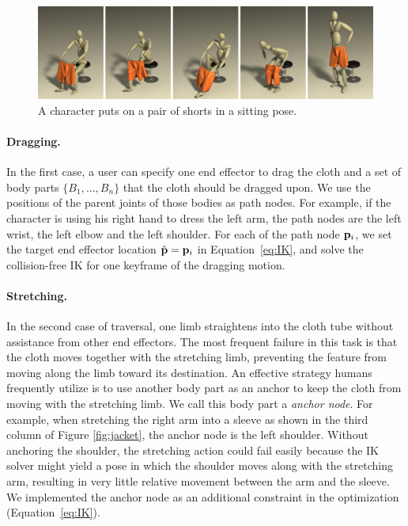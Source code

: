 \begin{figure}[!t]
  \centering
  \includegraphics[width=\textwidth]{images/shortsSitting}
  \caption{A character puts on a pair of shorts in a sitting pose.}
  \label{fig:shorts1}
\end{figure}



\paragraph{Dragging.} In the first case, a user can specify one end effector to drag the cloth and a set of body parts $\{B_1 ,..., B_n\}$ that the cloth should be dragged upon. We use the positions of the parent joints of those bodies as path nodes. For example, if the character is using his  right hand to dress the left arm, the path nodes are the left wrist, the left elbow and the left shoulder. For each of the path node $\mathbf{p}_i$, we set the target end effector location $\hat{\mathbf{p}}=\mathbf{p}_i$ in Equation~\ref{eq:IK}, and solve the collision-free IK for one keyframe of the dragging motion.

\paragraph{Stretching.} In the second case of traversal, one limb straightens into the cloth tube without assistance from other end effectors. The most frequent failure in this task is that the cloth moves together with the stretching limb, preventing the feature from moving along the limb toward its destination. An effective strategy humans frequently utilize is to use another body part as an anchor to keep the cloth from moving with the stretching limb. We call this body part a \emph{anchor node}. For example, when stretching the right arm into a sleeve as shown in the third column of Figure \ref{fig:jacket}, the anchor node is the left shoulder. Without anchoring the shoulder, the stretching action could fail easily because the IK solver might yield a pose in which the shoulder moves along with the stretching arm, resulting in very little relative movement between the arm and the sleeve. We implemented the anchor node as an additional constraint in the optimization (Equation~\ref{eq:IK}).

